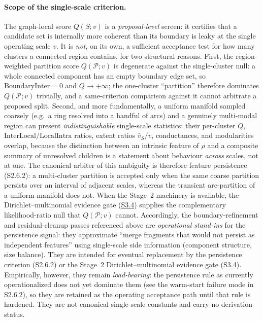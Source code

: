 \documentclass[11pt]{article}
\begin{document}
\paragraph{Scope of the single-scale criterion.}
The graph-local score $Q(S;v)$ is a \emph{proposal-level} screen: it certifies
that a candidate set is internally more coherent than its boundary is leaky at
the single operating scale $v$. It is \emph{not}, on its own, a sufficient
acceptance test for how many clusters a connected region contains, for two
structural reasons. First, the region-weighted partition score
$Q(\mathcal P;v)$ is degenerate against the single-cluster null: a whole
connected component has an empty boundary edge set, so
$\mathrm{BoundaryInter}=0$ and $Q\to+\infty$; the one-cluster ``partition''
therefore dominates $Q(\mathcal P;v)$ trivially, and a same-criterion
comparison against it cannot arbitrate a proposed split. Second, and more
fundamentally, a uniform manifold sampled coarsely (e.g.\ a ring resolved into a
handful of arcs) and a genuinely multi-modal region can present
\emph{indistinguishable} single-scale statistics: their per-cluster $Q$,
$\mathrm{InterLocal}/\mathrm{LocalIntra}$ ratios, extent ratios
$\hat v_S/v$, conductances, and modularities overlap, because the distinction
between an intrinsic feature of $\rho$ and a composite summary of unresolved
children is a statement about behaviour \emph{across} scales, not at one. The
canonical arbiter of this ambiguity is therefore feature persistence
(S2.6.2): a multi-cluster partition is accepted only when the same coarse
partition persists over an interval of adjacent scales, whereas the transient
arc-partition of a uniform manifold does not. When the Stage~2 machinery is
available, the Dirichlet--multinomial evidence gate (\hyperref[sec:si-dm-evidence]{S3.4})
supplies the complementary likelihood-ratio null that $Q(\mathcal P;v)$ cannot.
Accordingly, the boundary-refinement and residual-cleanup passes referenced
above are \emph{operational stand-ins} for the persistence signal: they
approximate ``merge fragments that would not persist as independent features''
using single-scale side information (component structure, size balance). They
are intended for eventual replacement by the persistence criterion (S2.6.2) or
the Stage~2 Dirichlet--multinomial evidence gate
(\hyperref[sec:si-dm-evidence]{S3.4}). Empirically, however, they remain
\emph{load-bearing}: the persistence rule as currently operationalized does not
yet dominate them (see the warm-start failure mode in S2.6.2), so they are
retained as the operating acceptance path until that rule is hardened. They are
not canonical single-scale constants and carry no derivation status.
\end{document}
